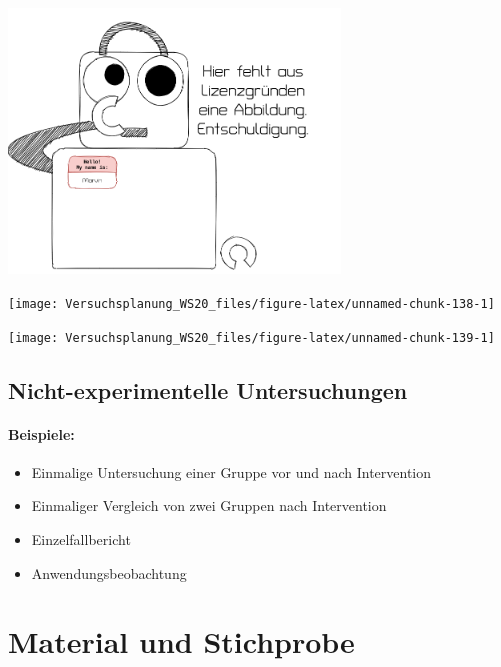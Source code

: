 \documentclass[
]{book}
\providecommand{\tightlist}{%
  \setlength{\itemsep}{0pt}\setlength{\parskip}{0pt}}
\begin{document}
\begin{center}\includegraphics[width=250pt]{imgs/copyright} \end{center}

\hypertarget{1}{}
\begin{center}\texttt{[image: Versuchsplanung\_WS20\_files/figure-latex/unnamed-chunk-138-1]} \end{center}

\hypertarget{2}{}
\begin{center}\texttt{[image: Versuchsplanung\_WS20\_files/figure-latex/unnamed-chunk-139-1]} \end{center}

\hypertarget{nicht-experimentelle-untersuchungen}{%
\section{Nicht-experimentelle Untersuchungen}\label{nicht-experimentelle-untersuchungen}}

\hypertarget{beispiele}{%
\subsubsection{Beispiele:}\label{beispiele}}

\begin{itemize}
\tightlist
\item
  Einmalige Untersuchung einer Gruppe vor und nach Intervention
\item
  Einmaliger Vergleich von zwei Gruppen nach Intervention
\item
  Einzelfallbericht
\item
  Anwendungsbeobachtung
\end{itemize}

\hypertarget{material-und-stichprobe}{%
\chapter{Material und Stichprobe}\label{material-und-stichprobe}}
\end{document}
